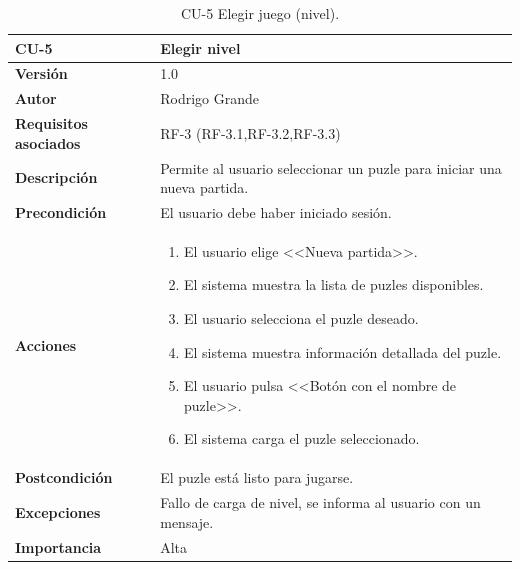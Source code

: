 \begin{table}[p]
	\centering
	\begin{tabularx}{\linewidth}{ p{} p{} }
		\toprule
		\textbf{CU-5} & \textbf{Elegir nivel}\\
		\toprule
		\textbf{Versión}              & 1.0    \\
		\textbf{Autor}                & Rodrigo Grande \\
		\textbf{Requisitos asociados} & RF-3 (RF-3.1,RF-3.2,RF-3.3) \\
		\textbf{Descripción}          & Permite al usuario seleccionar un puzle para iniciar una nueva partida.\\
		\textbf{Precondición}         & El usuario debe haber iniciado sesión. \\
		\textbf{Acciones}             &
		\begin{enumerate}
			\def\labelenumi{\arabic{enumi}.}
			\tightlist
			\item El usuario elige <<Nueva partida>>.
			\item El sistema muestra la lista de puzles disponibles.
			\item El usuario selecciona el puzle deseado.
			\item El sistema muestra información detallada del puzle.
			\item El usuario pulsa <<Botón con el nombre de puzle>>.
			\item El sistema carga el puzle seleccionado.
		\end{enumerate}\\
		\textbf{Postcondición}        & El puzle está listo para jugarse. \\
		\textbf{Excepciones}          & Fallo de carga de nivel, se informa al usuario con un mensaje. \\
		\textbf{Importancia}          & Alta \\
		\bottomrule
	\end{tabularx}
	\caption{CU-5 Elegir juego (nivel).}
	\label{cu:elegir-juego}
\end{table}

